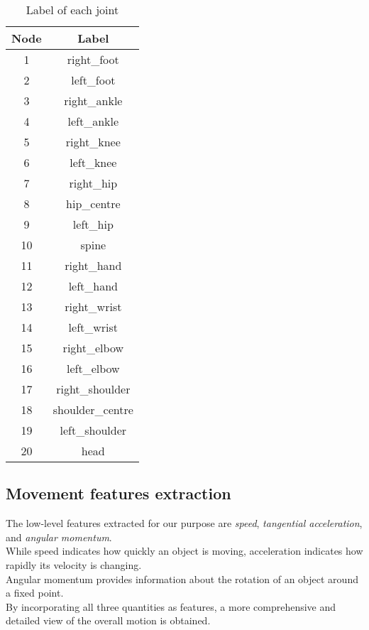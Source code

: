 \begin{table}[H]
  \centering
  \begin{tabular}{|c|c|}
      \hline
      \textbf{Node} & \textbf{Label} \\
      \hline
      1 & right\_foot \\
      2 & left\_foot \\
      3 & right\_ankle \\
      4 & left\_ankle \\
      5 & right\_knee \\
      6 & left\_knee \\
      7 & right\_hip \\
      8 & hip\_centre \\
      9 & left\_hip \\
      10 & spine \\
      11 & right\_hand \\
      12 & left\_hand \\
      13 & right\_wrist \\
      14 & left\_wrist \\
      15 & right\_elbow \\
      16 & left\_elbow \\
      17 & right\_shoulder \\
      18 & shoulder\_centre \\
      19 & left\_shoulder \\
      20 & head \\
      \hline
  \end{tabular}
  \caption{Label of each joint}
  \label{tab:labels_joints}
\end{table}


\subsection{Movement features extraction}
The low-level features extracted for our purpose are \textit{speed}, \textit{tangential acceleration}, and \textit{angular momentum}. \\
While speed indicates how quickly an object is moving, acceleration indicates how rapidly its velocity is changing.\\
Angular momentum provides information about the rotation of an object around a fixed point.\\
By incorporating all three quantities as features, a more comprehensive and detailed view of the overall motion is obtained.

